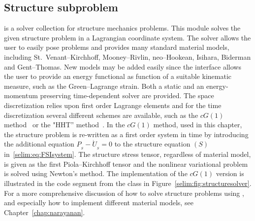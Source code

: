 
\subsection{Structure subproblem}

 is a solver collection for structure mechanics
problems. This module solves the given structure problem in a
Lagrangian coordinate system.  The solver allows the user to easily
pose problems and provides many standard material models, including
St.~Venant--Kirchhoff, Mooney--Rivlin, neo--Hookean, Isihara, Biderman
and Gent--Thomas. New models may be added easily since the interface
allows the user to provide an energy functional as function of a
suitable kinematic measure, such as the Green--Lagrange strain. Both a
static and an energy-momentum preserving time-dependent solver are
provided. The space discretization relies upon first order Lagrange
elements and for the time discretization several different schemes are
available, such as the $cG(1)$
method~\citep{ErikssonEstepHansboEtAl1996, ErikssonEstepJohnson2003} or
the "HHT'' method~\citep{HilberHughesTaylor1977}.  In the $cG(1)$
method, used in this chapter, the structure problem is re-written as a
first order system in time by introducing the additional equation
$P_{_{S}} - \dot{U}_{_{S}} = 0$ to the structure equation $(S)$
in~\eqref{selim:eq:FSIsystem}. The structure stress tensor, regardless
of material model, is given as the first Piola--Kirchhoff tensor and
the nonlinear variational problem is solved using Newton's method.
The implementation of the $cG(1)$ version is illustrated in the code
segment from the class  in
Figure~\ref{selim:fig:structuresolver}. For a more comprehensive
discussion of how to solve structure problems using
, and especially how to implement different material
models, see Chapter~\ref{chap:narayanan}.

